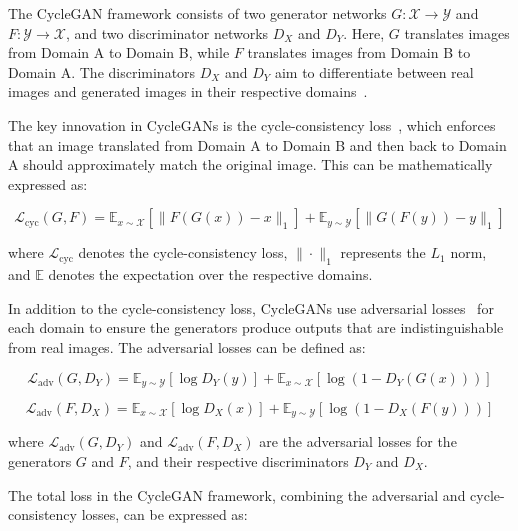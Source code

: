\documentclass[12pt,DIV14,BCOR12mm,a4paper,footinclude=false,headinclude,parskip=half-,twoside,openright,cleardoublepage=empty,toc=index,bibliography=totoc,listof=totoc]{scrreprt}
\numberwithin{equation}{chapter}
\begin{document}
The CycleGAN framework consists of two generator networks \(G: \mathcal{X} \to \mathcal{Y}\) and \(F: \mathcal{Y} \to \mathcal{X}\), and two discriminator networks \(D_X\) and \(D_Y\). Here, \(G\) translates images from Domain A to Domain B, while \(F\) translates images from Domain B to Domain A. The discriminators \(D_X\) and \(D_Y\) aim to differentiate between real images and generated images in their respective domains~\cite{almahairi2018augmented, zhu2017unpaired}.

The key innovation in CycleGANs is the cycle-consistency loss~\cite{dwibedi2019temporal, zhu2017unpaired}, which enforces that an image translated from Domain A to Domain B and then back to Domain A should approximately match the original image. This can be mathematically expressed as:

\begin{equation}
\mathcal{L}_{\text{cyc}}(G, F) = \mathbb{E}_{x \sim \mathcal{X}}[\|F(G(x)) - x\|_1] + \mathbb{E}_{y \sim \mathcal{Y}}[\|G(F(y)) - y\|_1]
\end{equation}

where \(\mathcal{L}_{\text{cyc}}\) denotes the cycle-consistency loss, \(\| \cdot \|_1\) represents the \(L_1\) norm, and \(\mathbb{E}\) denotes the expectation over the respective domains.

In addition to the cycle-consistency loss, CycleGANs use adversarial losses~\cite{dong2019towards} for each domain to ensure the generators produce outputs that are indistinguishable from real images. The adversarial losses can be defined as:

\begin{equation}
\mathcal{L}_{\text{adv}}(G, D_Y) = \mathbb{E}_{y \sim \mathcal{Y}}[\log D_Y(y)] + \mathbb{E}_{x \sim \mathcal{X}}[\log(1 - D_Y(G(x)))]
\end{equation}

\begin{equation}
\mathcal{L}_{\text{adv}}(F, D_X) = \mathbb{E}_{x \sim \mathcal{X}}[\log D_X(x)] + \mathbb{E}_{y \sim \mathcal{Y}}[\log(1 - D_X(F(y)))]
\end{equation}

where \(\mathcal{L}_{\text{adv}}(G, D_Y)\) and \(\mathcal{L}_{\text{adv}}(F, D_X)\) are the adversarial losses for the generators \(G\) and \(F\), and their respective discriminators \(D_Y\) and \(D_X\).

The total loss in the CycleGAN framework, combining the adversarial and cycle-consistency losses, can be expressed as:
\end{document}
